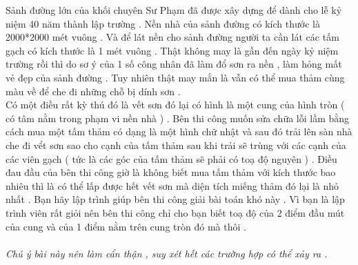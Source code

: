 Sảnh đường lớn của khối chuyên Sư Phạm đã được xây dựng để dành cho lễ kỷ niệm 40 năm thành lập trường . Nền nhà của sảnh đường có kích thước là 2000*2000 mét vuông . Và để lát nền cho sảnh đường người ta cần lát các tấm gạch có kích thước là 1 mét vuông . Thật không may là gần đến ngày kỷ niệm trường rồi thì do sơ ý của 1 số công nhân đã làm đổ sơn ra nền , làm hỏng mất vẻ đẹp của sảnh đường . Tuy nhiên thật may mắn là vẫn có thể mua thảm cùng màu về để che đi những chỗ bị dính sơn .   
\\   Có một điều rất kỳ thú đó là vết sơn đó lại có hình là một cung của hình tròn ( có tâm nằm trong phạm vi nền nhà ) . Bên thi công muốn sửa chữa lỗi lầm bằng cách mua một tấm thảm có dạng là một hình chữ nhật và sau đó trải lên sàn nhà che đi vểt sơn sao cho cạnh của tấm thảm sau khi trải sẽ trùng với các cạnh của các viên gạch ( tức là các góc của tấm thảm sẽ phải có toạ độ nguyên ) . Điều đau đầu của bên thi công giờ là không biết mua tấm thảm với kích thước bao nhiêu thì là có thể lấp được hết vết sơn mà diện tích miếng thảm đó lại là nhỏ nhất . Bạn hãy lập trình giúp bên thi công giải bài toán khó này . Vì bạn là lập trình viên rất giỏi nên bên thi công chỉ cho bạn biết toạ độ của 2 điểm đầu mút của cung và của 1 điểm nằm trên cung tròn đó mà thôi .   
\\
\\\textit{    Chú ý bài này nên làm cẩn thận , suy xét hết các trường hợp có thể xảy ra .   }